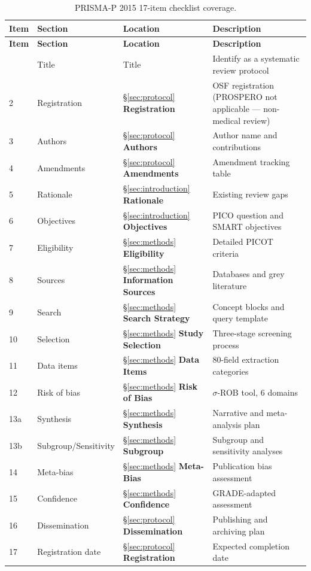 \begin{longtable}{p{0.5cm} p{2.5cm} p{3cm} p{6cm}}
\caption{PRISMA-P 2015 17-item checklist coverage.}\\
\toprule
\textbf{Item} & \textbf{Section} & \textbf{Location} & \textbf{Description} \\
\midrule
\endfirsthead
\toprule
\textbf{Item} & \textbf{Section} & \textbf{Location} & \textbf{Description} \\
\midrule
\endhead
\bottomrule
\endfoot
1 & Title & Title & Identify as a systematic review protocol \\
2 & Registration & \S\ref{sec:protocol} \textbf{Registration} & OSF registration (PROSPERO not applicable — non-medical review) \\
3 & Authors & \S\ref{sec:protocol} \textbf{Authors} & Author name and contributions \\
4 & Amendments & \S\ref{sec:protocol} \textbf{Amendments} & Amendment tracking table \\
5 & Rationale & \S\ref{sec:introduction} \textbf{Rationale} & Existing review gaps \\
6 & Objectives & \S\ref{sec:introduction} \textbf{Objectives} & PICO question and SMART objectives \\
7 & Eligibility & \S\ref{sec:methods} \textbf{Eligibility} & Detailed PICOT criteria \\
8 & Sources & \S\ref{sec:methods} \textbf{Information Sources} & Databases and grey literature \\
9 & Search & \S\ref{sec:methods} \textbf{Search Strategy} & Concept blocks and query template \\
10 & Selection & \S\ref{sec:methods} \textbf{Study Selection} & Three-stage screening process \\
11 & Data items & \S\ref{sec:methods} \textbf{Data Items} & 80-field extraction categories \\
12 & Risk of bias & \S\ref{sec:methods} \textbf{Risk of Bias} & $\sigma$-ROB tool, 6 domains \\
13a & Synthesis & \S\ref{sec:methods} \textbf{Synthesis} & Narrative and meta-analysis plan \\
13b & Subgroup/Sensitivity & \S\ref{sec:methods} \textbf{Subgroup} & Subgroup and sensitivity analyses \\
14 & Meta-bias & \S\ref{sec:methods} \textbf{Meta-Bias} & Publication bias assessment \\
15 & Confidence & \S\ref{sec:methods} \textbf{Confidence} & GRADE-adapted assessment \\
16 & Dissemination & \S\ref{sec:protocol} \textbf{Dissemination} & Publishing and archiving plan \\
17 & Registration date & \S\ref{sec:protocol} \textbf{Registration} & Expected completion date \\
\bottomrule
\end{longtable}

